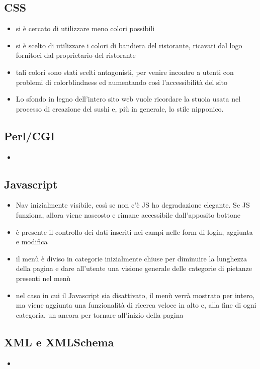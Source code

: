 \documentclass[../relazione.tex]{subfiles}
\begin{document}
	\subsection{CSS}
	\begin{itemize}
		\item si è cercato di utilizzare meno colori possibili
		\item si è scelto di utilizzare i colori di bandiera del ristorante, ricavati dal logo fornitoci dal proprietario del ristorante
		\item tali colori sono stati scelti antagonisti, per venire incontro a utenti con problemi di colorblindness ed aumentando così l'accessibilità del sito
		\item Lo sfondo in legno dell'intero sito web vuole ricordare la stuoia usata nel processo di creazione del sushi e, più in generale, lo stile nipponico.
	\end{itemize}
	\subsection{Perl/CGI}
	\begin{itemize}
		\item 
	\end{itemize}
	\subsection{Javascript}
	\begin{itemize}
		\item Nav inizialmente visibile, così se non c'è JS ho degradazione elegante. Se JS funziona, allora viene nascosto e rimane accessibile dall'apposito bottone
		\item è presente il controllo dei dati inseriti nei campi nelle form di login, aggiunta e modifica
		\item il menù è diviso in categorie inizialmente chiuse per diminuire la lunghezza della pagina e dare all'utente una visione generale delle categorie di pietanze presenti nel menù
		\item nel caso in cui il Javascript sia disattivato, il menù verrà mostrato per intero, ma viene aggiunta una funzionalità di ricerca veloce in alto e, alla fine di ogni categoria, un ancora per tornare all'inizio della pagina
	\end{itemize}
	\subsection{XML e XMLSchema}
	\begin{itemize}
		\item 
	\end{itemize}
\end{document}
